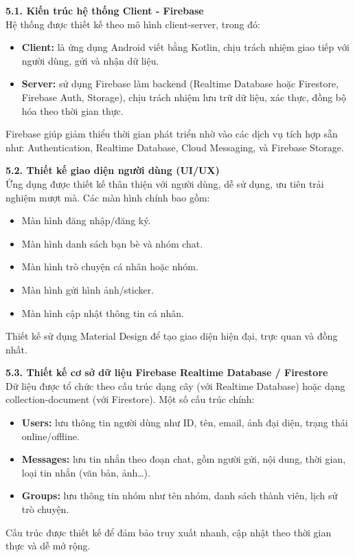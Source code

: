 \documentclass[12pt,a4paper]{article}
\begin{document}
	\textbf{5.1. Kiến trúc hệ thống Client - Firebase} \\
	Hệ thống được thiết kế theo mô hình client-server, trong đó:
	\begin{itemize}
		\item \textbf{Client:} là ứng dụng Android viết bằng Kotlin, chịu trách nhiệm giao tiếp với người dùng, gửi và nhận dữ liệu.
		\item \textbf{Server:} sử dụng Firebase làm backend (Realtime Database hoặc Firestore, Firebase Auth, Storage), chịu trách nhiệm lưu trữ dữ liệu, xác thực, đồng bộ hóa theo thời gian thực.
	\end{itemize}
	Firebase giúp giảm thiểu thời gian phát triển nhờ vào các dịch vụ tích hợp sẵn như: Authentication, Realtime Database, Cloud Messaging, và Firebase Storage.
	
	\textbf{5.2. Thiết kế giao diện người dùng (UI/UX)} \\
	Ứng dụng được thiết kế thân thiện với người dùng, dễ sử dụng, ưu tiên trải nghiệm mượt mà. Các màn hình chính bao gồm:
	\begin{itemize}
		\item Màn hình đăng nhập/đăng ký.
		\item Màn hình danh sách bạn bè và nhóm chat.
		\item Màn hình trò chuyện cá nhân hoặc nhóm.
		\item Màn hình gửi hình ảnh/sticker.
		\item Màn hình cập nhật thông tin cá nhân.
	\end{itemize}
	Thiết kế sử dụng Material Design để tạo giao diện hiện đại, trực quan và đồng nhất.
	
	\textbf{5.3. Thiết kế cơ sở dữ liệu Firebase Realtime Database / Firestore} \\
	Dữ liệu được tổ chức theo cấu trúc dạng cây (với Realtime Database) hoặc dạng collection-document (với Firestore). Một số cấu trúc chính:
	\begin{itemize}
		\item \textbf{Users:} lưu thông tin người dùng như ID, tên, email, ảnh đại diện, trạng thái online/offline.
		\item \textbf{Messages:} lưu tin nhắn theo đoạn chat, gồm người gửi, nội dung, thời gian, loại tin nhắn (văn bản, ảnh…).
		\item \textbf{Groups:} lưu thông tin nhóm như tên nhóm, danh sách thành viên, lịch sử trò chuyện.
	\end{itemize}
	Cấu trúc được thiết kế để đảm bảo truy xuất nhanh, cập nhật theo thời gian thực và dễ mở rộng.
	
\end{document}
